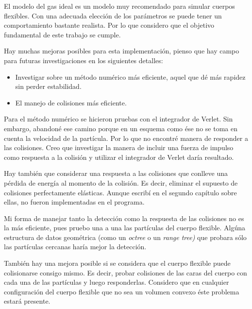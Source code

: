 El modelo del gas ideal es un modelo muy recomendado para simular cuerpos flexibles.
Con una adecuada elección de los parámetros se puede tener un comportamiento bastante realista.
Por lo que considero que el objetivo fundamental de este trabajo se cumple.

Hay muchas mejoras posibles para esta implementación, pienso que hay campo para futuras investigaciones en los siguientes detalles:

\begin{itemize}
 \item Investigar sobre un método numérico más eficiente, aquel que dé más rapidez sin perder estabilidad.
 \item El manejo de colisiones más eficiente.
\end{itemize}

Para el método numérico se hicieron pruebas con el integrador de Verlet.
Sin embargo, abandoné ese camino porque en un esquema como ése no se toma en cuenta la velocidad de la partícula.
Por lo que no encontré manera de responder a las colisiones.
Creo que investigar la manera de incluir una fuerza de impulso como respuesta a la colisión y utilizar el integrador de Verlet daría resultado.

Hay también que considerar una respuesta a las colisiones que conlleve una pérdida de energía al momento de la colisión.
Es decir, eliminar el supuesto de colisiones perfectamente elásticas.
Aunque escribí en el segundo capítulo sobre ellas, no fueron implementadas en el programa.

Mi forma de manejar tanto la detección como la respuesta de las colisiones  no es la más eficiente, pues pruebo una a una las partículas del cuerpo flexible.
Algúna estructura de datos geométrica (como un \emph{\textenglish{octree}} o un \emph{\textenglish{range tree})} que probara sólo las partículas cercanas haría mejor la detección.

También hay una mejora posible si se considera que el cuerpo flexible puede colisionarse consigo mismo. 
Es decir, probar colisiones de las caras del cuerpo con cada una de las partículas y luego responderlas.
Considero que en cualquier configuración del cuerpo flexible que no sea un volumen convexo éste problema estará presente.

